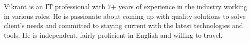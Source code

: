 

\begin{cvparagraph}

Vikrant is an IT professional with 7+ years of experience in the industry working in various roles. He is passionate about coming up with quality solutions to solve client's needs and committed to staying current with the latest technologies and tools. He is independent, fairly proficient in English and willing to travel.
\end{cvparagraph}
